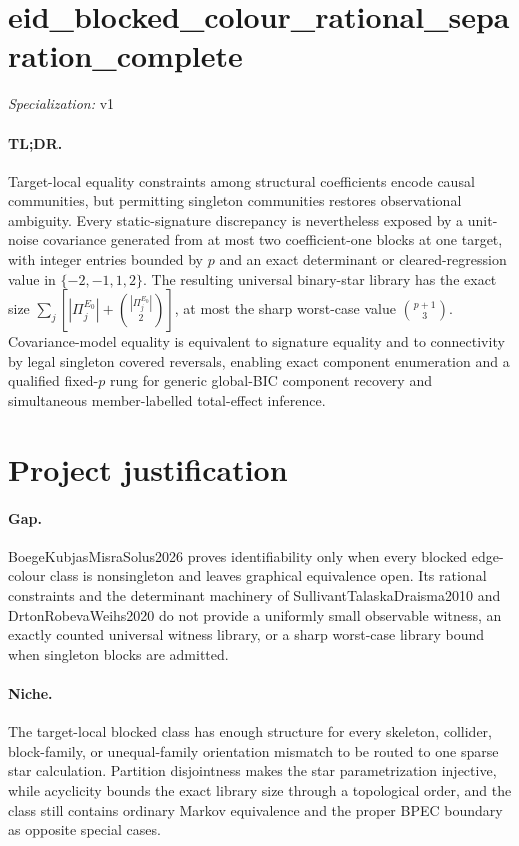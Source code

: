 \documentclass{article}
\begin{document}
\sloppy

\section*{eid\_\allowbreak{}blocked\_\allowbreak{}colour\_\allowbreak{}rational\_\allowbreak{}separation\_\allowbreak{}complete}

\noindent\textit{Specialization:} v1\par

\paragraph{TL;DR.} Target-local equality constraints among structural coefficients encode causal communities, but permitting singleton communities restores observational ambiguity. Every static-signature discrepancy is nevertheless exposed by a unit-noise covariance generated from at most two coefficient-one blocks at one target, with integer entries bounded by \(p\) and an exact determinant or cleared-regression value in \(\{-2,-1,1,2\}\). The resulting universal binary-star library has the exact size \(\sum_j[|\Pi^{E_0}_j|+\binom{|\Pi^{E_0}_j|}{2}]\), at most the sharp worst-case value \(\binom{p+1}{3}\). Covariance-model equality is equivalent to signature equality and to connectivity by legal singleton covered reversals, enabling exact component enumeration and a qualified fixed-\(p\) rung for generic global-BIC component recovery and simultaneous member-labelled total-effect inference.

\section{Project justification}

\paragraph{Gap.} BoegeKubjasMisraSolus2026 proves identifiability only when every blocked edge-colour class is nonsingleton and leaves graphical equivalence open. Its rational constraints and the determinant machinery of SullivantTalaskaDraisma2010 and DrtonRobevaWeihs2020 do not provide a uniformly small observable witness, an exactly counted universal witness library, or a sharp worst-case library bound when singleton blocks are admitted.

\paragraph{Niche.} The target-local blocked class has enough structure for every skeleton, collider, block-family, or unequal-family orientation mismatch to be routed to one sparse star calculation. Partition disjointness makes the star parametrization injective, while acyclicity bounds the exact library size through a topological order, and the class still contains ordinary Markov equivalence and the proper BPEC boundary as opposite special cases.
\end{document}
